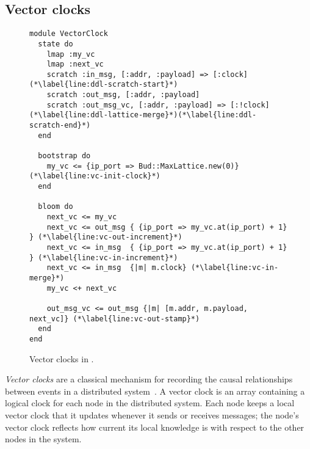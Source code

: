 
\subsection{Vector clocks}
\begin{figure}[t]
\begin{scriptsize}
\begin{lstlisting}
module VectorClock
  state do
    lmap :my_vc
    lmap :next_vc
    scratch :in_msg, [:addr, :payload] => [:clock] (*\label{line:ddl-scratch-start}*)
    scratch :out_msg, [:addr, :payload]
    scratch :out_msg_vc, [:addr, :payload] => [:!clock] (*\label{line:ddl-lattice-merge}*)(*\label{line:ddl-scratch-end}*)
  end

  bootstrap do
    my_vc <= {ip_port => Bud::MaxLattice.new(0)} (*\label{line:vc-init-clock}*)
  end

  bloom do
    next_vc <= my_vc
    next_vc <= out_msg { {ip_port => my_vc.at(ip_port) + 1} } (*\label{line:vc-out-increment}*)
    next_vc <= in_msg  { {ip_port => my_vc.at(ip_port) + 1} } (*\label{line:vc-in-increment}*)
    next_vc <= in_msg  {|m| m.clock} (*\label{line:vc-in-merge}*)
    my_vc <+ next_vc

    out_msg_vc <= out_msg {|m| [m.addr, m.payload, next_vc]} (*\label{line:vc-out-stamp}*)
  end
end
\end{lstlisting}
\end{scriptsize}
\caption{Vector clocks in \lang.}
\label{fig:vector-clock-src}
\end{figure}

\emph{Vector clocks} are a classical mechanism for recording the causal
relationships between events in a distributed
system~\cite{Fidge1988,Mattern1989}.  A vector clock is an array containing a
logical clock for each node in the distributed system. Each node keeps a local
vector clock that it updates whenever it sends or receives messages; the node's
vector clock reflects how current its local knowledge is with respect to the
other nodes in the system.

